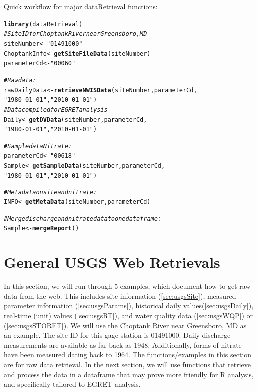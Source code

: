 \documentclass[a4paper,11pt]{article}\usepackage[]{graphicx}\usepackage[]{color}
\makeatletter
\newcommand{\hlstr}[1]{\textcolor[rgb]{0.192,0.494,0.8}{#1}}%
\newcommand{\hlcom}[1]{\textcolor[rgb]{0.678,0.584,0.686}{\textit{#1}}}%
\newcommand{\hlstd}[1]{\textcolor[rgb]{0.345,0.345,0.345}{#1}}%
\newcommand{\hlkwb}[1]{\textcolor[rgb]{0.69,0.353,0.396}{#1}}%
\newcommand{\hlkwd}[1]{\textcolor[rgb]{0.737,0.353,0.396}{\textbf{#1}}}%
\newenvironment{kframe}{%
 \def\at@end@of@kframe{}%
 \ifinner\ifhmode%
  \def\at@end@of@kframe{\end{minipage}}%
  \begin{minipage}{\columnwidth}%
 \fi\fi%
 \def\FrameCommand##1{\hskip\@totalleftmargin \hskip-\fboxsep
 \colorbox{shadecolor}{##1}\hskip-\fboxsep
     \hskip-\linewidth \hskip-\@totalleftmargin \hskip\columnwidth}%
 \MakeFramed {\advance\hsize-\width
   \@totalleftmargin\z@ \linewidth\hsize
   \@setminipage}}%
 {\par\unskip\endMakeFramed%
 \at@end@of@kframe}
\newenvironment{knitrout}{}{} %
\makeatother
\begin{document}
Quick workflow for major dataRetrieval functions:
\begin{knitrout}
\color{fgcolor}\begin{kframe}
\begin{alltt}
\hlkwd{library}\hlstd{(dataRetrieval)}
\hlcom{# Site ID for Choptank River near Greensboro, MD}
\hlstd{siteNumber} \hlkwb{<-} \hlstr{"01491000"}
\hlstd{ChoptankInfo} \hlkwb{<-} \hlkwd{getSiteFileData}\hlstd{(siteNumber)}
\hlstd{parameterCd} \hlkwb{<-} \hlstr{"00060"}

\hlcom{#Raw data:}
\hlstd{rawDailyData} \hlkwb{<-} \hlkwd{retrieveNWISData}\hlstd{(siteNumber,parameterCd,}
                      \hlstr{"1980-01-01"}\hlstd{,}\hlstr{"2010-01-01"}\hlstd{)}
\hlcom{# Data compiled for EGRET analysis}
\hlstd{Daily} \hlkwb{<-} \hlkwd{getDVData}\hlstd{(siteNumber,parameterCd,}
                      \hlstr{"1980-01-01"}\hlstd{,}\hlstr{"2010-01-01"}\hlstd{)}

\hlcom{# Sample data Nitrate:}
\hlstd{parameterCd} \hlkwb{<-} \hlstr{"00618"}
\hlstd{Sample} \hlkwb{<-} \hlkwd{getSampleData}\hlstd{(siteNumber,parameterCd,}
                      \hlstr{"1980-01-01"}\hlstd{,}\hlstr{"2010-01-01"}\hlstd{)}

\hlcom{# Metadata on site and nitrate:}
\hlstd{INFO} \hlkwb{<-} \hlkwd{getMetaData}\hlstd{(siteNumber,parameterCd)}

\hlcom{# Merge discharge and nitrate data to one dataframe:}
\hlstd{Sample} \hlkwb{<-} \hlkwd{mergeReport}\hlstd{()}
\end{alltt}
\end{kframe}
\end{knitrout}



\section{General USGS Web Retrievals}
In this section, we will run through 5 examples, which document how to get raw data from the web. This includes site information (\ref{sec:usgsSite}), measured parameter information (\ref{sec:usgsParams}), historical daily values(\ref{sec:usgsDaily}), real-time (unit) values (\ref{sec:usgsRT}), and water quality data (\ref{sec:usgsWQP}) or (\ref{sec:usgsSTORET}). We will use the Choptank River near Greensboro, MD as an example.  The site-ID for this gage station is 01491000. Daily discharge measurements are available as far back as 1948.  Additionally, forms of nitrate have been measured dating back to 1964. The functions/examples in this section are for raw data retrieval.  In the next section, we will use functions that retrieve and process the data in a dataframe that may prove more friendly for R analysis, and specifically tailored to EGRET analysis.
\end{document}
